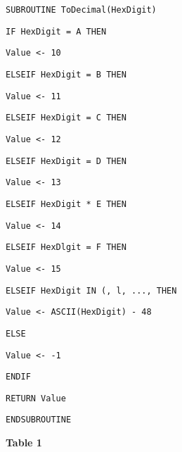 \noindent %
\noindent\begin{minipage}[t]{1\columnwidth}%
\texttt{SUBROUTINE ToDecimal(HexDigit)}

\texttt{\qquad{}IF HexDigit = \textquotedbl A\textquotedbl{} THEN }

\texttt{\qquad{}\qquad{}Value <- 10}

\texttt{\qquad{}ELSEIF HexDigit = \textquotedbl B\textquotedbl{}
THEN }

\texttt{\qquad{}\qquad{}Value <- 11}

\texttt{\qquad{}ELSEIF HexDigit = \textquotedbl C\textquotedbl{}
THEN}

\texttt{\qquad{}\qquad{}Value <- 12}

\texttt{\qquad{}ELSEIF HexDigit = \textquotedbl D\textquotedbl{}
THEN }

\texttt{\qquad{}\qquad{}Value <- 13}

\texttt{\qquad{}ELSEIF HexDigit {*} \textquotedbl E\textquotedbl{}
THEN }

\texttt{\qquad{}\qquad{}Value <- 14}

\texttt{\qquad{}ELSEIF HexDlgit = \textquotedbl F\textquotedbl{}
THEN }

\texttt{\qquad{}\qquad{}Value <- 15}

\texttt{\qquad{}ELSEIF HexDigit IN (\textquotedbl ,
\textquotedbl l\textquotedbl , ..., \textquotedbl{]}
THEN }

\texttt{\qquad{}\qquad{}Value <- ASCII(HexDigit) - 48}

\texttt{\qquad{}ELSE }

\texttt{\qquad{}\qquad{}Value <- -1}

\texttt{\qquad{}ENDIF}

\texttt{\qquad{}RETURN Value}

\texttt{ENDSUBROUTINE}%
\end{minipage}
\noindent \begin{center}
\textbf{Table 1} 
\par\end{center}

